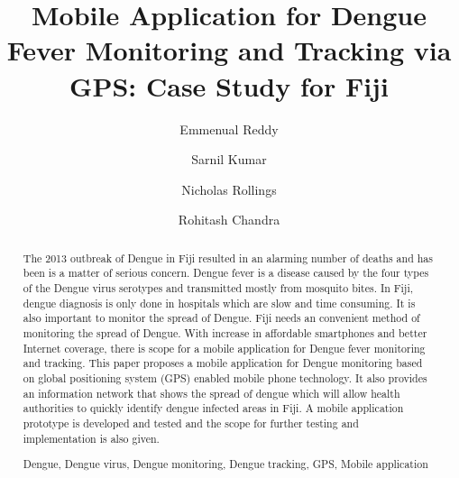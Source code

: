 \documentclass[runningheads,a4paper]{llncs}
\newcommand{\keywords}[1]{\par\addvspace\baselineskip
\noindent\keywordname\enspace\ignorespaces#1}
\begin{document}
\mainmatter  

\title{Mobile Application for Dengue Fever Monitoring and Tracking via GPS: Case Study for Fiji}


\author{Emmenual Reddy  \and Sarnil Kumar  \and Nicholas Rollings   \and Rohitash Chandra }



 




\maketitle


\begin{abstract}
The 2013 outbreak of Dengue in Fiji resulted in an alarming number of deaths and has been is a matter of serious concern. Dengue fever is a disease caused by the four types of the Dengue virus serotypes  and transmitted mostly from mosquito bites. In Fiji, dengue diagnosis is only done in hospitals which are slow and time consuming. It is also important to monitor the spread of Dengue. Fiji needs an convenient method of monitoring the spread of Dengue. With increase in affordable smartphones and better Internet coverage, there is scope for  a mobile application for Dengue fever monitoring and tracking. This paper proposes  a mobile application for Dengue monitoring based on global positioning system (GPS) enabled mobile phone technology. It also provides an information network that shows the spread of dengue which will allow health authorities to quickly identify dengue infected areas in Fiji. A mobile application prototype is developed and tested and the scope for further testing and implementation is also given.

\keywords{Dengue, Dengue virus, Dengue monitoring, Dengue tracking, GPS, Mobile application}
\end{abstract}
\end{document}
